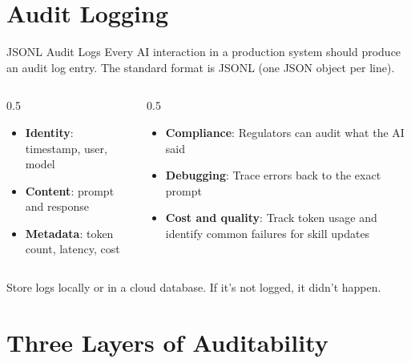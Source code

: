 \documentclass[aspectratio=169]{beamer}
\begin{document}
\section{Audit Logging}

\begin{frame}{JSONL Audit Logs}
Every AI interaction in a production system should produce an \alert{audit log entry}. The standard format is JSONL (one JSON object per line).
\vspace{0.3cm}
\begin{columns}[T]
\begin{column}{0.5\textwidth}
\begin{shadedbox}[title=\textbf{What to Log}]
\begin{itemize}\small
  \item \textbf{Identity}: timestamp, user, model
  \item \textbf{Content}: prompt and response
  \item \textbf{Metadata}: token count, latency, cost
\end{itemize}
\end{shadedbox}
\end{column}
\begin{column}{0.5\textwidth}
\begin{shadedbox}[title=\textbf{Why It Matters}]
\begin{itemize}\small
  \item \textbf{Compliance}: Regulators can audit what the AI said
  \item \textbf{Debugging}: Trace errors back to the exact prompt
  \item \textbf{Cost and quality}: Track token usage and identify common failures for skill updates
\end{itemize}
\end{shadedbox}
\end{column}
\end{columns}
\vspace{0.3cm}
Store logs locally or in a cloud database.  \alert{If it's not logged, it didn't happen.}
\end{frame}

\section{Three Layers of Auditability}
\end{document}
